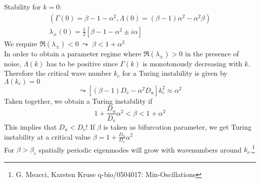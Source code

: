 Stability for $k=0$:
\begin{align*}
	\left(\Gamma(0)=\beta-1-\alpha^2,\Lambda(0)=(\beta-1)\alpha^2-\alpha^2\beta\right)\\
	\lambda_\pm(0)=\frac{1}{2}\left[\beta-1-\alpha^2\pm i\alpha\right]
\end{align*}
We require $\Re(\lambda_\pm)<0 \ \leadsto$ \underline{\underline{$\beta < 1+\alpha^2$}}\\
In order to obtain a parameter regime where $\Re(\lambda_\pm)>0$ in the presence of noise, $\Lambda(k)$ has to be positive since $\Gamma(k)$ is monotonously decreasing with $k$. Therefore the critical wave number $k_c$ for a Turing instability is given by $\Lambda(k_c)=0$
\begin{equation*}
	\leadsto\left[(\beta-1)D_v-\alpha^2D_u\right]k_c^2\approx\alpha^2
\end{equation*}
Taken together, we obtain a Turing instability if
\begin{equation*}
	1+\frac{D_u}{D_v}\alpha^2 < \beta < 1+\alpha^2
\end{equation*}
This implies that $D_u<D_v$!
If $\beta$ is taken as bifurcation parameter, we get Turing instability at a critical value $\beta=1+\frac{D_u}{D_v}\alpha^2$\\
For $\beta > \beta_c$ spatially periodic eigenmodes will grow with wavenumbers around $k_c$.\footnote{G. Meacci, Karsten Kruse q-bio/0504017: Min-Oscillations}\\

